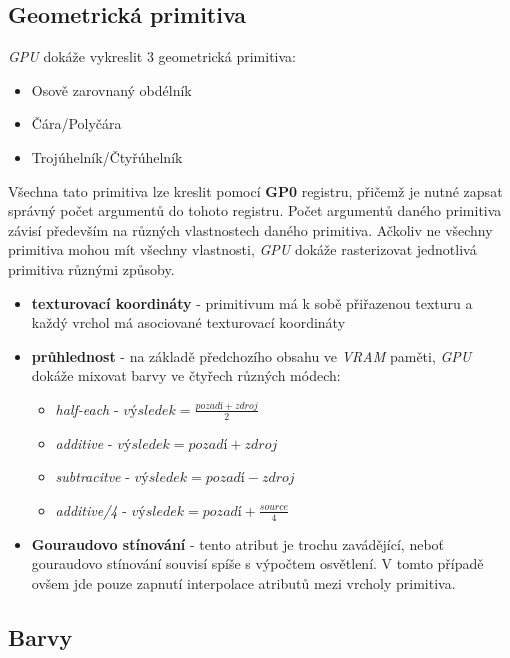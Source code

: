 \subsection{Geometrická primitiva}

\textit{GPU} dokáže vykreslit 3 geometrická primitiva:

\begin{itemize}
    \item{Osově zarovnaný obdélník}
    \item{Čára/Polyčára}
    \item{Trojúhelník/Čtyřúhelník}
\end{itemize}

Všechna tato primitiva lze kreslit pomocí \textbf{GP0} registru, přičemž je nutné zapsat správný počet argumentů do tohoto registru.
Počet argumentů daného primitiva závisí především na různých vlastnostech daného primitiva. Ačkoliv ne všechny primitiva mohou mít
všechny vlastnosti, \textit{GPU} dokáže rasterizovat jednotlivá primitiva různými způsoby.

\begin{itemize}
    \item{\textbf{texturovací koordináty} - primitivum má k sobě přiřazenou texturu a každý vrchol má asociované texturovací koordináty}
    \item{\textbf{průhlednost} - na základě předchozího obsahu ve \textit{VRAM} paměti, \textit{GPU} dokáže mixovat barvy ve čtyřech různých módech:
        \begin{itemize}
            \item{\textit{half-each} - $výsledek = \frac{pozadí + zdroj}{2}$}
            \item{\textit{additive} - $výsledek = pozadí + zdroj$}
            \item{\textit{subtracitve} - $výsledek = pozadí - zdroj$}
            \item{\textit{additive/4} - $výsledek = pozadí + \frac{source}{4}$}
        \end{itemize}
    }
    \item{\textbf{Gouraudovo stínování} - tento atribut je trochu zavádějící, neboť gouraudovo stínování souvisí spíše s výpočtem osvětlení. V tomto případě ovšem jde pouze zapnutí interpolace atributů mezi vrcholy primitiva.}
\end{itemize}

\subsection{Barvy}

